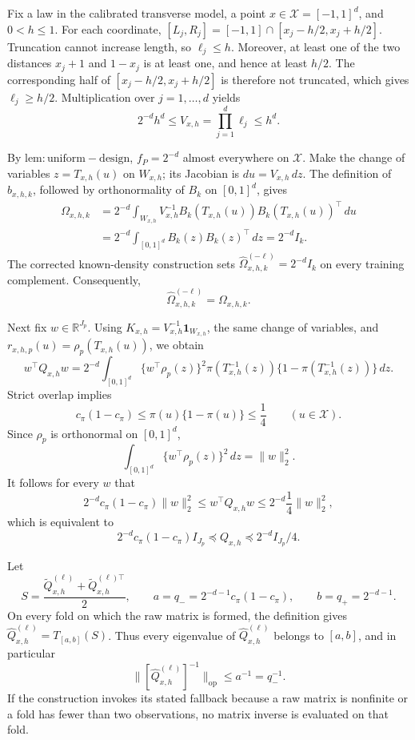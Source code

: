 Fix a law in the calibrated transverse model, a point \(x\in\mathcal X=[-1,1]^d\), and \(0<h\le 1\). For each coordinate, \([L_j,R_j]=[-1,1]\cap[x_j-h/2,x_j+h/2]\). Truncation cannot increase length, so \(\ell_j\le h\). Moreover, at least one of the two distances \(x_j+1\) and \(1-x_j\) is at least one, and hence at least \(h/2\). The corresponding half of \([x_j-h/2,x_j+h/2]\) is therefore not truncated, which gives \(\ell_j\ge h/2\). Multiplication over \(j=1,\ldots,d\) yields
\[
 2^{-d}h^d\le V_{x,h}=\prod_{j=1}^d\ell_j\le h^d.
\]

By \(\mathrm{lem:uniform-design}\), \(f_P=2^{-d}\) almost everywhere on \(\mathcal X\). Make the change of variables \(z=T_{x,h}(u)\) on \(W_{x,h}\); its Jacobian is \(du=V_{x,h}\,dz\). The definition of \(b_{x,h,k}\), followed by orthonormality of \(B_k\) on \([0,1]^d\), gives
\[
\begin{aligned}
 \Omega_{x,h,k}
 &=2^{-d}\int_{W_{x,h}}V_{x,h}^{-1}
 B_k(T_{x,h}(u))B_k(T_{x,h}(u))^\top\,du\\
 &=2^{-d}\int_{[0,1]^d}B_k(z)B_k(z)^\top\,dz
 =2^{-d}I_k.
\end{aligned}
\]
The corrected known-density construction sets \(\widehat\Omega^{(-\ell)}_{x,h,k}=2^{-d}I_k\) on every training complement. Consequently,
\[
 \widehat\Omega^{(-\ell)}_{x,h,k}=\Omega_{x,h,k}.
\]

Next fix \(w\in\mathbb R^{J_p}\). Using \(K_{x,h}=V_{x,h}^{-1}\mathbf 1_{W_{x,h}}\), the same change of variables, and \(r_{x,h,p}(u)=\rho_p(T_{x,h}(u))\), we obtain
\[
 w^\top Q_{x,h}w
 =2^{-d}\int_{[0,1]^d}
 \{w^\top\rho_p(z)\}^2
 \pi(T_{x,h}^{-1}(z))\{1-\pi(T_{x,h}^{-1}(z))\}\,dz.
\]
Strict overlap implies
\[
 c_\pi(1-c_\pi)
 \le \pi(u)\{1-\pi(u)\}
 \le \frac14
 \qquad (u\in\mathcal X).
\]
Since \(\rho_p\) is orthonormal on \([0,1]^d\),
\[
 \int_{[0,1]^d}\{w^\top\rho_p(z)\}^2\,dz=\|w\|_2^2.
\]
It follows for every \(w\) that
\[
 2^{-d}c_\pi(1-c_\pi)\|w\|_2^2
 \le w^\top Q_{x,h}w
 \le 2^{-d}\frac14\|w\|_2^2,
\]
which is equivalent to
\[
 2^{-d}c_\pi(1-c_\pi)I_{J_p}
 \preceq Q_{x,h}
 \preceq 2^{-d}I_{J_p}/4.
\]

Let
\[
 S=\frac{\widetilde Q^{(\ell)}_{x,h}+\widetilde Q^{(\ell)\top}_{x,h}}2,
 \qquad a=q_-=2^{-d-1}c_\pi(1-c_\pi),
 \qquad b=q_+=2^{-d-1}.
\]
On every fold on which the raw matrix is formed, the definition gives \(\widehat Q^{(\ell)}_{x,h}=T_{[a,b]}(S)\). Thus every eigenvalue of \(\widehat Q^{(\ell)}_{x,h}\) belongs to \([a,b]\), and in particular
\[
 \|[\widehat Q^{(\ell)}_{x,h}]^{-1}\|_{\mathrm{op}}
 \le a^{-1}=q_-^{-1}.
\]
If the construction invokes its stated fallback because a raw matrix is nonfinite or a fold has fewer than two observations, no matrix inverse is evaluated on that fold.

